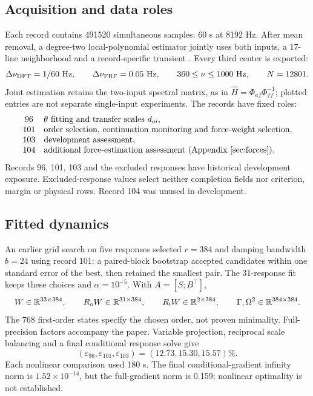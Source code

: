 \subsection{Acquisition and data roles}
Each record contains 491520 simultaneous samples: 60 s at 8192 Hz.
After mean removal, a degree-two local-polynomial estimator jointly uses
both inputs, a 17-line neighborhood and a record-specific transient
\citep{pintelon2010,pintelon2010b}. Every third center is exported:
\[
 \Delta\nu_{\rm DFT}=1/60\ \mathrm{Hz},\qquad
 \Delta\nu_{\rm FRF}=0.05\ \mathrm{Hz},\qquad
 360\le\nu\le1000\ \mathrm{Hz},\qquad N=12801.
\]
Joint estimation retains the two-input spectral matrix, as in
$\widehat H=\Phi_{af}\Phi_{ff}^{-1}$; plotted entries are not separate
single-input experiments. The records have fixed roles:
\[
 \begin{array}{cl}
 96&\theta\text{ fitting and transfer scales }d_{oi},\\
 101&\text{order selection, continuation monitoring and force-weight selection},\\
 103&\text{development assessment},\\
 104&\text{additional force-estimation assessment (Appendix~\ref{sec:forces})}.
 \end{array}
\]
Records 96, 101, 103 and the excluded responses have historical development
exposure. Excluded-response values select neither completion fields nor
criterion, margin or physical rows. Record 104 was unused in development.

\subsection{Fitted dynamics}
An earlier grid search on five responses selected $r=384$ and damping
bandwidth $b=24$ using record 101: a paired-block bootstrap accepted
candidates within one standard error of the best, then retained the smallest
pair. The 31-response fit keeps these choices and $\alpha=10^{-5}$.
With $A=[S;B^{\top}]$,
\[
 W\in\mathbb R^{33\times384},\qquad R_{\rm o}W\in\mathbb R^{31\times384},\qquad
 R_{\rm i}W\in\mathbb R^{2\times384},\qquad
 \Gamma,\Omega^2\in\mathbb R^{384\times384}.
\]
The 768 first-order states specify the chosen order, not proven minimality.
Full-precision factors accompany the paper. Variable projection, reciprocal
scale balancing and a final conditional response solve give
\[
 (\varepsilon_{96},\varepsilon_{101},\varepsilon_{103})
 =(12.73,15.30,15.57)\%.
\]
Each nonlinear comparison used 180 s. The final conditional-gradient
infinity norm is $1.52\times10^{-14}$, but the full-gradient norm is 0.159;
nonlinear optimality is not established.

